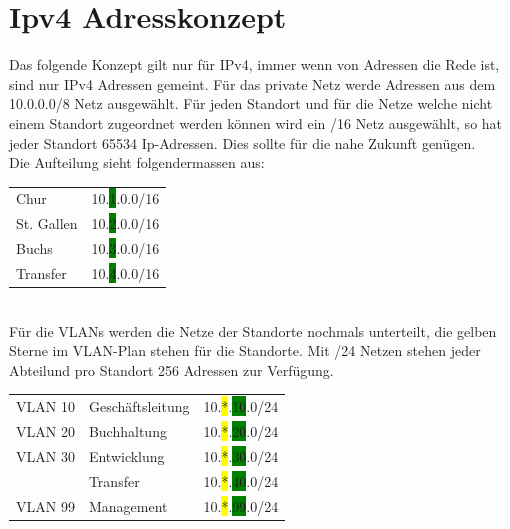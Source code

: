 \documentclass[11pt,a4paper]{scrreprt}
\begin{document}
\section{Ipv4 Adresskonzept} \label{ipv4}
Das folgende Konzept gilt nur für IPv4, immer wenn von Adressen die Rede ist, sind nur IPv4 Adressen gemeint.
Für das private Netz werde Adressen aus dem 10.0.0.0/8 Netz ausgewählt. Für jeden Standort und für die Netze welche nicht einem Standort zugeordnet werden können wird ein /16 Netz ausgewählt, so hat jeder Standort 65534 Ip-Adressen. Dies sollte für die nahe Zukunft genügen.\\
\newline
Die Aufteilung sieht folgendermassen aus: \\
\newline
\hspace*{1cm} 
\begin{tabular}{ll}
    Chur & 10.\colorbox{green}{1}.0.0/16\\
    St. Gallen & 10.\colorbox{green}{2}.0.0/16\\
    Buchs & 10.\colorbox{green}{3}.0.0/16\\
    Transfer & 10.\colorbox{green}{4}.0.0/16\\
\end{tabular}\\
\newline
Für die \acs{VLAN}s werden die Netze der Standorte nochmals unterteilt, die gelben Sterne im \acs{VLAN}-Plan stehen für die Standorte. Mit /24 Netzen stehen jeder Abteilund pro Standort 256 Adressen zur Verfügung.\\
\newline
\hspace*{1cm} 
\begin{tabular}{lll}
     \acs{VLAN} 10 & Geschäftsleitung & 10.\colorbox{yellow}{*}.\colorbox{green}{10}.0/24\\
     \acs{VLAN} 20 & Buchhaltung & 10.\colorbox{yellow}{*}.\colorbox{green}{20}.0/24\\
     \acs{VLAN} 30 & Entwicklung & 10.\colorbox{yellow}{*}.\colorbox{green}{30}.0/24\\
             & Transfer & 10.\colorbox{yellow}{*}.\colorbox{green}{40}.0/24\\
     \acs{VLAN} 99 & Management & 10.\colorbox{yellow}{*}.\colorbox{green}{99}.0/24\\
\end{tabular}
\newpage
\end{document}

